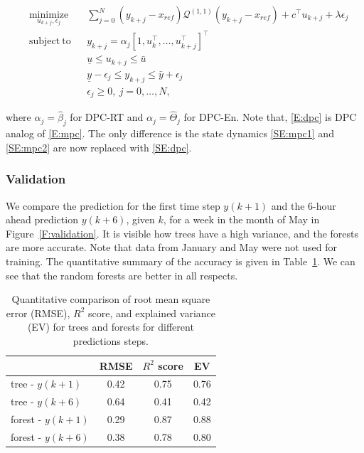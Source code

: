 \begin{subequations}
	\begin{align}
	& \underset{u_{k+j},\epsilon_j}{\mathrm{minimize}} & & \sum_{j=0}^{N} (y_{k+j}-x_{ref})\mathcal{Q}^{(1,1)} (y_{k+j}-x_{ref})+c^\top u_{k+j}+\lambda\epsilon_j \\
	& \mathrm{subject\ to }                              & & y_{k+j} =  \alpha_j \left[1,u^\top_{k},\ldots,u^\top_{k+j} \right]^\top \label{SE:dpc}               \\
	&                                                    & & \underline{u} \leq u_{k+j} \leq \bar{u} 	                                                          \\
	&                                                    & & \underline{y} - \epsilon_j \leq y_{k+j} \leq \bar{y} + \epsilon_j                                    \\
	&                                                    & & \epsilon_j \geq 0, \ j = 0,\dots,N,            									                 
	\end{align}\label{E:dpc}
\end{subequations} 

\noindent where $\alpha_j = \hat \beta_{j}$ for DPC-RT and $\alpha_j = \hat{\Theta}_{j}$ for DPC-En.
Note that, \eqref{E:dpc} is DPC analog of \eqref{E:mpc}. The only difference is the state dynamics \eqref{SE:mpc1} and \eqref{SE:mpc2} are now replaced with \eqref{SE:dpc}.

\subsubsection{Validation} 
\label{SSS:dpc_val}

We compare the prediction for the first time step $y(k+1)$ and the 6-hour ahead prediction $y(k+6)$, given $k$, for a week in the month of May in Figure~\ref{F:validation}. It is visible how trees have a high variance, and the forests are more accurate. Note that data from January and May were not used for training. The quantitative summary of the accuracy is given in Table~\ref{T:validation}. We can see that the random forests are better in all respects.
\begin{table}[h!]
	\centering
	\begin{tabular}{lccc}
		\toprule
		                 & RMSE & $R^2$ score & EV  \\ 
		\midrule
		tree - $y(k+1)$    & 0.42 & 0.75        & 0.76 \\
		tree - $y(k+6)$    & 0.64 & 0.41        & 0.42 \\
		forest - $y(k+1)$  & 0.29 & 0.87        & 0.88 \\
		forest - $y(k+6)$  & 0.38 & 0.78        & 0.80 \\
		\bottomrule
	\end{tabular}
	\caption{Quantitative comparison of root mean square error (RMSE), $R^2$ score, and explained variance (EV) for trees and forests for different predictions steps.}
	\captionsetup{justification=centering}
	\label{T:validation}
\end{table}


